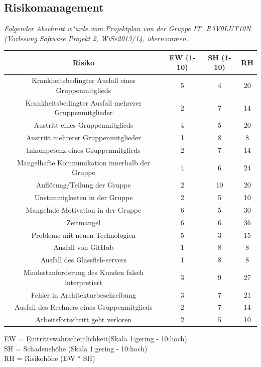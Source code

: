 \documentclass[fontsize=12pt,paper=a4,twoside]{scrartcl}
\begin{document}
\subsection{Risikomanagement}\label{riskmanagement}
\textit{Folgender Abschnitt w"urde vom Projektplan von der Gruppe IT\_R3V0LUT10N (Vorlesung Software Projekt 2, WiSe2013/14, übernommen.}\\
\begin{center}
\begin{tabular}{|c|c|c|c|} \hline 
\textbf{Risiko} & \textbf{EW (1-10)} & \textbf{SH (1-10)} & \textbf{RH}\\ \hline \hline
Krankheitsbedingter Ausfall eines Gruppenmitglieds & 5  & 4 & 20\\ \hline
Krankheitsbedingter Ausfall mehrerer Gruppenmitglieder & 2  & 7 & 14\\ \hline
Austritt eines Gruppenmitglieds & 4 & 5 & 20\\ \hline
Austritt mehrerer Gruppenmitglieder & 1 & 8 & 8\\ \hline
Inkompetenz eines Gruppenmitglieds & 2 & 7 & 14\\ \hline
Mangelhafte Kommunikation innerhalb der Gruppe & 4 & 6 & 24\\ \hline
Auflösung/Teilung der Gruppe & 2 & 10 & 20\\ \hline
Unstimmigkeiten in der Gruppe & 2 & 5 & 10\\ \hline
Mangelnde Motivation in der Gruppe & 6 & 5 & 30\\ \hline
Zeitmangel & 6 & 6 & 36\\ \hline
Probleme mit neuen Technologien & 5 & 3 & 15\\ \hline
Ausfall von GitHub & 1 & 8 & 8\\ \hline
Ausfall des Glassfish-servers & 1 & 8 & 8\\ \hline
Mindestanforderung des Kunden falsch interpretiert & 3 & 9 & 27\\ \hline
Fehler in Architekturbeschreibung & 3 & 7 & 21\\ \hline
Ausfall des Rechners eines Gruppenmitglieds & 2 & 7 & 14\\ \hline
Arbeitsfortschritt geht verloren & 2 & 5 & 10\\ \hline
\end{tabular}
\end{center}
EW = Eintrittswahrscheinlichkeit(Skala 1:gering - 10:hoch)\\
SH = Schadenshöhe (Skala 1:gering - 10:hoch)\\
RH = Risikohöhe (EW * SH)\\
\end{document}
